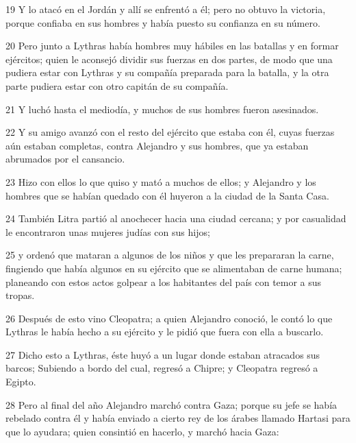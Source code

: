 \par 19 Y lo atacó en el Jordán y allí se enfrentó a él; pero no obtuvo la victoria, porque confiaba en sus hombres y había puesto su confianza en su número.

\par 20 Pero junto a Lythras había hombres muy hábiles en las batallas y en formar ejércitos; quien le aconsejó dividir sus fuerzas en dos partes, de modo que una pudiera estar con Lythras y su compañía preparada para la batalla, y la otra parte pudiera estar con otro capitán de su compañía.

\par 21 Y luchó hasta el mediodía, y muchos de sus hombres fueron asesinados.

\par 22 Y su amigo avanzó con el resto del ejército que estaba con él, cuyas fuerzas aún estaban completas, contra Alejandro y sus hombres, que ya estaban abrumados por el cansancio.

\par 23 Hizo con ellos lo que quiso y mató a muchos de ellos; y Alejandro y los hombres que se habían quedado con él huyeron a la ciudad de la Santa Casa.

\par 24 También Litra partió al anochecer hacia una ciudad cercana; y por casualidad le encontraron unas mujeres judías con sus hijos;

\par 25 y ordenó que mataran a algunos de los niños y que les prepararan la carne, fingiendo que había algunos en su ejército que se alimentaban de carne humana; planeando con estos actos golpear a los habitantes del país con temor a sus tropas.

\par 26 Después de esto vino Cleopatra; a quien Alejandro conoció, le contó lo que Lythras le había hecho a su ejército y le pidió que fuera con ella a buscarlo.

\par 27 Dicho esto a Lythras, éste huyó a un lugar donde estaban atracados sus barcos; Subiendo a bordo del cual, regresó a Chipre; y Cleopatra regresó a Egipto.

\par 28 Pero al final del año Alejandro marchó contra Gaza; porque su jefe se había rebelado contra él y había enviado a cierto rey de los árabes llamado Hartasi para que lo ayudara; quien consintió en hacerlo, y marchó hacia Gaza:


